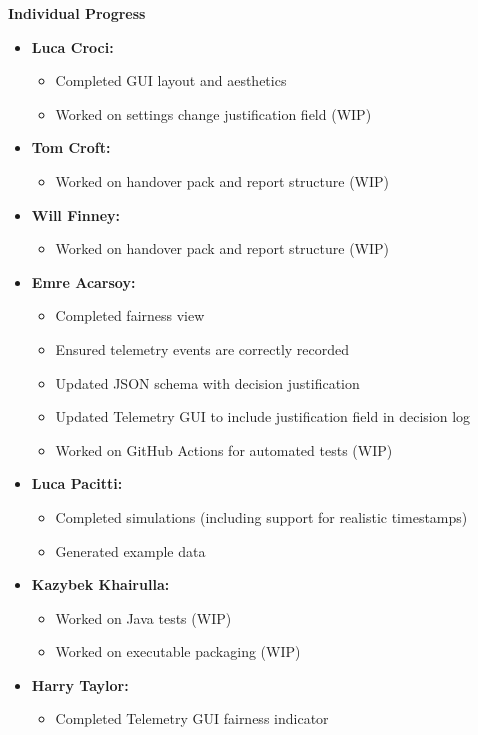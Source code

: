 \documentclass[11pt]{article}
\begin{document}
    \textbf{Individual Progress}
    \begin{itemize}
        \item \textbf{Luca Croci:}
        \begin{itemize}
            \item Completed GUI layout and aesthetics
            \item Worked on settings change justification field (WIP)
        \end{itemize}

        \item \textbf{Tom Croft:}
        \begin{itemize}
            \item Worked on handover pack and report structure (WIP)
        \end{itemize}

        \item \textbf{Will Finney:}
        \begin{itemize}
            \item Worked on handover pack and report structure (WIP)
        \end{itemize}

        \item \textbf{Emre Acarsoy:}
        \begin{itemize}
            \item Completed fairness view
            \item Ensured telemetry events are correctly recorded
            \item Updated JSON schema with decision justification
            \item Updated Telemetry GUI to include justification field in decision log
            \item Worked on GitHub Actions for automated tests (WIP)
        \end{itemize}

        \item \textbf{Luca Pacitti:}
        \begin{itemize}
            \item Completed simulations (including support for realistic timestamps)
            \item Generated example data
        \end{itemize}

        \item \textbf{Kazybek Khairulla:}
        \begin{itemize}
            \item Worked on Java tests (WIP)
            \item Worked on executable packaging (WIP)
        \end{itemize}

        \item \textbf{Harry Taylor:}
        \begin{itemize}
            \item Completed Telemetry GUI fairness indicator
        \end{itemize}
    \end{itemize}
\end{document}
